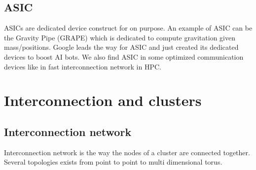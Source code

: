 \subsection{ASIC}
ASICs are dedicated device construct for on purpose. 
An example of ASIC can be the Gravity Pipe (GRAPE) which is dedicated to compute gravitation given mass/positions.
Google leads the way for ASIC and just created its dedicated devices to boost AI bots.
We also find ASIC in some optimized communication devices like in fast interconnection network in HPC.  

\section{Interconnection and clusters}

\subsection{Interconnection network}
Interconnection network is the way the nodes of a cluster are connected together. 
Several topologies exists from point to point to multi dimensional torus.

